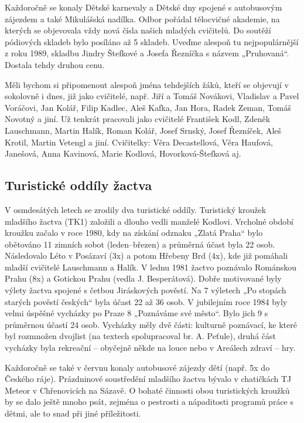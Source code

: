 Každoročně se konaly Dětské karnevaly a Dětské dny spojené s autobusovým
zájezdem a také Mikulášská nadílka. Odbor pořádal tělocvičné akademie,
na kterých se objevovala vždy nová čísla našich mladých cvičitelů. Do
soutěží pódiových skladeb bylo posíláno až 5 skladeb. Uveďme alespoň tu
nejpopulárnější z roku 1989, skladbu Jindry Štefkové a Josefa Řezníčka s
názvem „Pruhovaná``. Dostala tehdy druhou cenu.

Měli bychom si připomenout alespoň jména tehdejších žáků, kteří se
objevují v sokolovně i dnes, již jako cvičitelé, např. Jiří a Tomáš
Novákovi, Vladislav a Pavel Voráčovi, Jan Kolář, Filip Kadlec, Aleš
Kafka, Jan Hora, Radek Zeman, Tomáš Novotný a jiní. Už tenkrát pracovali
jako cvičitelé František Kodl, Zdeněk Lauschmann, Martin Halík, Roman
Kolář, Josef Srnský, Josef Řezníček, Aleš Krotil, Martin Vetengl a jiní.
Cvičitelky: Věra Decastellová, Věra Haufová, Janešová, Anna Kavinová,
Marie Kodlová, Hovorková-Štefková aj.

\subsection{Turistické oddíly
žactva}\label{turistickuxe9-odduxedly-ux17eactva}

V osmdesátých letech se zrodily dva turistické oddíly. Turistický
kroužek mladšího žactva (TK1) založili a dlouho vedli manželé Kodlovi.
Vrcholné období kroužku začalo v roce 1980, kdy na získání odznaku
„Zlatá Praha`` bylo obětováno 11 zimních sobot (leden--březen) a
průměrná účast byla 22 osob. Následovalo Léto v Posázaví (3x) a potom
Hřebeny Brd (4x), kde již pomáhali mladší cvičitelé Lauschmann a Halík.
V lednu 1981 žactvo poznávalo Románskou Prahu (8x) a Gotickou Prahu
(vedla J. Besperátová). Dobře motivované byly výlety žactva spojené s
četbou Jiráskových pověstí. Na 7 výletech „Po stopách starých pověstí
českých`` byla účast 22 až 36 osob. V jubilejním roce 1984 byly velmi
úspěšné vycházky po Praze 8 „Poznáváme své město``. Bylo jich 9 s
průměrnou účastí 24 osob. Vycházky měly dvě části: kulturně poznávací,
ke které byl rozmnožen dvojlist (na textech spolupracoval br. A.
Peťule), druhá část vycházky byla rekreační -- obyčejně někde na louce
nebo v Areálech zdraví -- hry.

Každoročně se také v červnu konaly autobusové zájezdy dětí (např. 5x do
Českého ráje). Prázdninové soustředění mladšího žactva bývalo v
chatičkách TJ Meteor v Chřenovicích na Sázavě. O bohaté činnosti obou
turistických kroužků by se dalo ještě mnoho psát, zejména o pestrosti a
nápaditosti programů práce s dětmi, ale to snad při jiné příležitosti.

